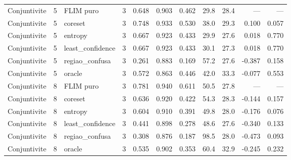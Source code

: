 \begin{tabular}{lllrrrrrrrr}
Conjuntivite & 5 & FLIM puro & 3 & 0.648 & 0.903 & 0.462 & 29.8 & 28.4 & --- & --- \\
Conjuntivite & 5 & coreset & 3 & 0.748 & 0.933 & 0.530 & 38.0 & 29.3 & 0.100 & 0.057 \\
Conjuntivite & 5 & entropy & 3 & 0.667 & 0.923 & 0.433 & 29.9 & 27.6 & 0.018 & 0.770 \\
Conjuntivite & 5 & least\_confidence & 3 & 0.667 & 0.923 & 0.433 & 30.1 & 27.3 & 0.018 & 0.770 \\
Conjuntivite & 5 & regiao\_confusa & 3 & 0.261 & 0.883 & 0.169 & 57.2 & 27.6 & -0.387 & 0.158 \\
Conjuntivite & 5 & oracle & 3 & 0.572 & 0.863 & 0.446 & 42.0 & 33.3 & -0.077 & 0.553 \\
Conjuntivite & 8 & FLIM puro & 3 & 0.781 & 0.940 & 0.611 & 50.5 & 27.8 & --- & --- \\
Conjuntivite & 8 & coreset & 3 & 0.636 & 0.920 & 0.422 & 54.3 & 28.3 & -0.144 & 0.157 \\
Conjuntivite & 8 & entropy & 3 & 0.604 & 0.910 & 0.391 & 49.8 & 28.0 & -0.176 & 0.076 \\
Conjuntivite & 8 & least\_confidence & 3 & 0.441 & 0.898 & 0.278 & 48.6 & 27.6 & -0.340 & 0.133 \\
Conjuntivite & 8 & regiao\_confusa & 3 & 0.308 & 0.876 & 0.187 & 98.5 & 28.0 & -0.473 & 0.093 \\
Conjuntivite & 8 & oracle & 3 & 0.535 & 0.902 & 0.353 & 60.4 & 32.9 & -0.245 & 0.232 \\
\hline
\end{tabular}
